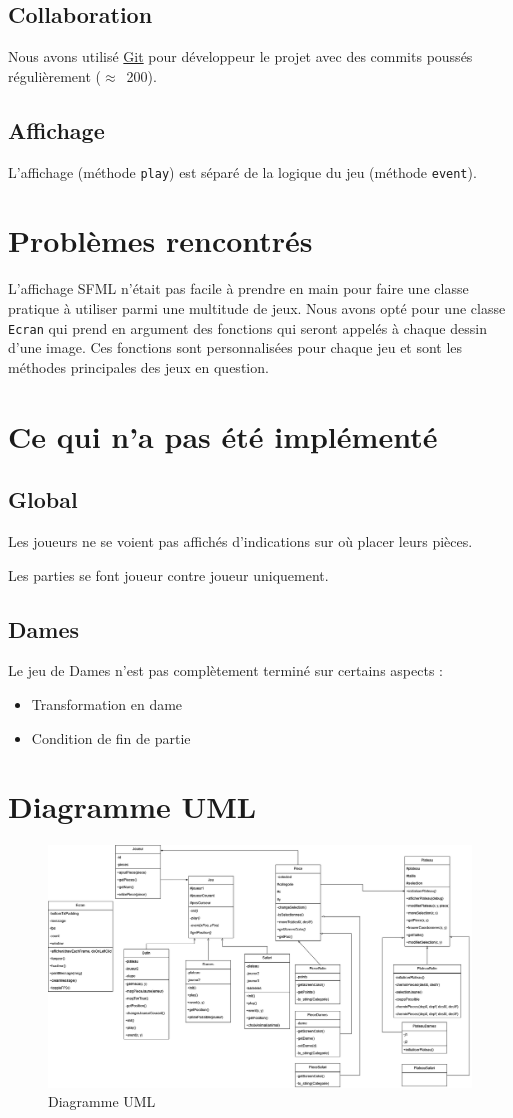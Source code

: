 \documentclass{article}
\begin{document}
\subsection{Collaboration}
Nous avons utilisé
\href{https://gaufre.informatique.univ-paris-diderot.fr/Anri/projet-cpp}{Git}
pour développeur le projet avec des commits poussés régulièrement ($\approx$~200).

\subsection{Affichage}
L'affichage (méthode \texttt{play}) est séparé de la logique du jeu
(méthode \texttt{event}).

\section{Problèmes rencontrés}
L'affichage SFML n'était pas facile à prendre en main pour faire une classe
pratique à utiliser parmi une multitude de jeux. Nous avons opté pour une classe
\texttt{Ecran} qui prend en argument des fonctions qui seront appelés à chaque
dessin d'une image. Ces fonctions sont personnalisées pour chaque jeu et sont
les méthodes principales des jeux en question.

\section{Ce qui n'a pas été implémenté}
\subsection*{Global}
Les joueurs ne se voient pas affichés d'indications sur où placer leurs pièces.

\separator
Les parties se font joueur contre joueur uniquement.

\subsection*{Dames}
Le jeu de Dames n'est pas complètement terminé sur certains aspects :
\begin{itemize}
  \item Transformation en dame
  \item Condition de fin de partie
\end{itemize}

\newpage
\section{Diagramme UML} %
\begin{figure}[h]
  \hspace{-12em}
  \includegraphics[width=1.7\textwidth]{imgs/diagrammeUML.png}
  \caption{Diagramme UML}
\end{figure}
\end{document}
